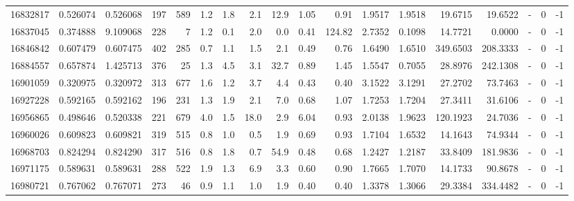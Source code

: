 \begin{tabular}{rrrrrrrrrrrrrrrlrr}
  16832817 & 0.526074 &   0.526068 &  197 &  589 &      1.2 &      1.8 &     2.1 &     12.9 &       1.05 &        0.91 &  1.9517 &  1.9518 &   19.6715 &   19.6522 &             - &        0 &         -1 \\
  16837045 & 0.374888 &   9.109068 &  228 &    7 &      1.2 &      0.1 &     2.0 &      0.0 &       0.41 &      124.82 &  2.7352 &  0.1098 &   14.7721 &    0.0000 &             - &        0 &         -1 \\
  16846842 & 0.607479 &   0.607475 &  402 &  285 &      0.7 &      1.1 &     1.5 &      2.1 &       0.49 &        0.76 &  1.6490 &  1.6510 &  349.6503 &  208.3333 &             - &        0 &         -1 \\
  16884557 & 0.657874 &   1.425713 &  376 &   25 &      1.3 &      4.5 &     3.1 &     32.7 &       0.89 &        1.45 &  1.5547 &  0.7055 &   28.8976 &  242.1308 &             - &        0 &         -1 \\
  16901059 & 0.320975 &   0.320972 &  313 &  677 &      1.6 &      1.2 &     3.7 &      4.4 &       0.43 &        0.40 &  3.1522 &  3.1291 &   27.2702 &   73.7463 &             - &        0 &         -1 \\
  16927228 & 0.592165 &   0.592162 &  196 &  231 &      1.3 &      1.9 &     2.1 &      7.0 &       0.68 &        1.07 &  1.7253 &  1.7204 &   27.3411 &   31.6106 &             - &        0 &         -1 \\
  16956865 & 0.498646 &   0.520338 &  221 &  679 &      4.0 &      1.5 &    18.0 &      2.9 &       6.04 &        0.93 &  2.0138 &  1.9623 &  120.1923 &   24.7036 &             - &        0 &         -1 \\
  16960026 & 0.609823 &   0.609821 &  319 &  515 &      0.8 &      1.0 &     0.5 &      1.9 &       0.69 &        0.93 &  1.7104 &  1.6532 &   14.1643 &   74.9344 &             - &        0 &         -1 \\
  16968703 & 0.824294 &   0.824290 &  317 &  516 &      0.8 &      1.8 &     0.7 &     54.9 &       0.48 &        0.68 &  1.2427 &  1.2187 &   33.8409 &  181.9836 &             - &        0 &         -1 \\
  16971175 & 0.589631 &   0.589631 &  288 &  522 &      1.9 &      1.3 &     6.9 &      3.3 &       0.60 &        0.90 &  1.7665 &  1.7070 &   14.1733 &   90.8678 &             - &        0 &         -1 \\
  16980721 & 0.767062 &   0.767071 &  273 &   46 &      0.9 &      1.1 &     1.0 &      1.9 &       0.40 &        0.40 &  1.3378 &  1.3066 &   29.3384 &  334.4482 &             - &        0 &         -1 \\

\end{tabular}
